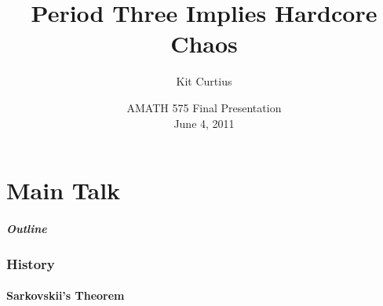 \documentclass[notes]{beamer}
\title{Period Three Implies Hardcore Chaos}
\author[Curtius]{
Kit Curtius \inst{1}
}
\institute[]{
\inst{1}
University of Washington, Applied Mathematics, USA
}
\date[AMath 2011]{AMATH 575 Final Presentation\\
June 4, 2011}
\begin{document}
\frame{\titlepage}

\part<presentation>{Main Talk}

\begin{frame}
  \frametitle{Outline}
    \tableofcontents
\end{frame}


\section[History]{History}
\subsection[Sarkovskii's Theorem]{Sarkovskii's Theorem}

%
\end{document}
